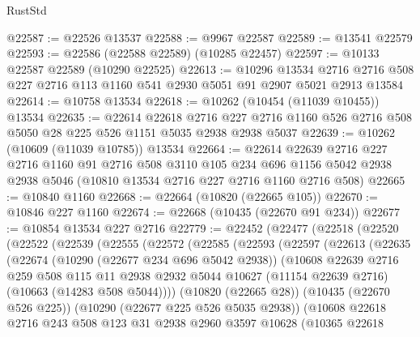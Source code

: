 \begin{lexlean}{RustStd}
\begin{coremodule}
@22587 := @22526 @13537
@22588 := @9967 @22587
@22589 := @13541 @22579
@22593 := @22586 (@22588 @22589) (@10285 @22457)
@22597 := @10133 @22587 @22589 (@10290 @22525)
@22613 := @10296
    @13534
    @2716
    @2716
    @508
    @227
    @2716
    @113
    @1160
    @541
    @2930
    @5051
    @91
    @2907
    @5021
    @2913
    @13584
@22614 := @10758 @13534
@22618 := @10262 (@10454 (@11039 @10455)) @13534
@22635 := @22614
    @22618
    @2716
    @227
    @2716
    @1160
    @526
    @2716
    @508
    @5050
    @28
    @225
    @526
    @1151
    @5035
    @2938
    @2938
    @5037
@22639 := @10262 (@10609 (@11039 @10785)) @13534
@22664 := @22614
    @22639
    @2716
    @227
    @2716
    @1160
    @91
    @2716
    @508
    @3110
    @105
    @234
    @696
    @1156
    @5042
    @2938
    @2938
    @5046
    (@10810 @13534 @2716 @227 @2716 @1160 @2716 @508)
@22665 := @10840 @1160
@22668 := @22664 (@10820 (@22665 @105))
@22670 := @10846 @227 @1160
@22674 := @22668 (@10435 (@22670 @91 @234))
@22677 := @10854 @13534 @227 @2716
@22779 := @22452
    (@22477
      (@22518
        (@22520
          (@22522
            (@22539
              (@22555
                (@22572
                  (@22585
                    (@22593
                      (@22597
                        (@22613
                          (@22635
                            (@22674
                              (@10290 (@22677 @234 @696 @5042 @2938))
                              (@10608
                                @22639
                                @2716
                                @259
                                @508
                                @115
                                @11
                                @2938
                                @2932
                                @5044
                                @10627
                                (@11154 @22639 @2716)
                                (@10663 (@14283 @508 @5044))))
                            (@10820 (@22665 @28))
                            (@10435 (@22670 @526 @225))
                            (@10290 (@22677 @225 @526 @5035 @2938))
                            (@10608
                              @22618
                              @2716
                              @243
                              @508
                              @123
                              @31
                              @2938
                              @2960
                              @3597
                              @10628
                              (@10365
                                @22618

\end{coremodule}
\end{lexlean}
